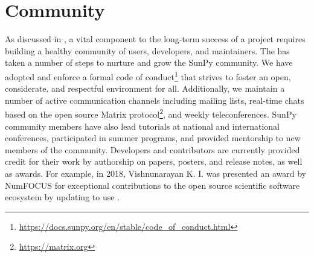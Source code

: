 \section{Community}
\label{sec:community}

As discussed in \citet{bangerth2013}, a vital component to the long-term success of a project requires building a healthy community of users, developers, and maintainers.
The \sunpyproj has taken a number of steps to nurture and grow the SunPy community.
We have adopted and enforce a formal code of conduct\footnote{\url{https://docs.sunpy.org/en/stable/code_of_conduct.html}} that strives to foster an open, considerate, and respectful environment for all.
Additionally, we maintain a number of active communication channels including mailing lists, real-time chats based on the open source Matrix protocol\footnote{\url{https://matrix.org}}, and weekly teleconferences.
SunPy community members have also lead tutorials at national and international conferences, participated in summer programs, and provided mentorship to new members of the community.
Developers and contributors are currently provided credit for their work by authorship on papers, posters, and release notes, as well as awards.
For example, in 2018, Vishnunarayan K. I. was presented an award by NumFOCUS for exceptional contributions to the open source scientific software ecosystem by updating \sunpypkg to use .
